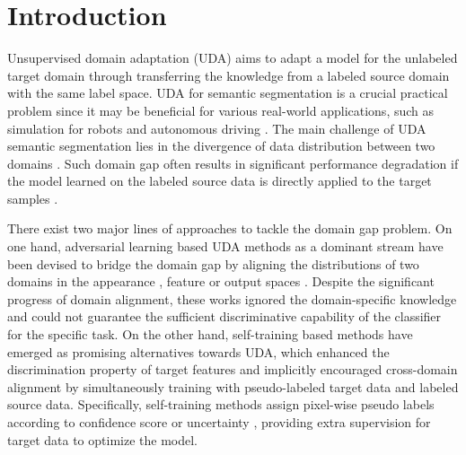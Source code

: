 \documentclass[final]{cvpr}
\begin{document}
\vspace{-0.5cm}
\section{Introduction}
\vspace{-0.2cm}
Unsupervised domain adaptation (UDA) aims to adapt a model for the unlabeled target domain through transferring the knowledge from a labeled source domain with the same label space. UDA for semantic segmentation is a crucial practical problem since it may be beneficial for various real-world applications, such as simulation for robots \cite{james2019sim} and autonomous driving \cite{wang2020differential}. The main challenge of UDA semantic segmentation lies in the divergence of data distribution between two domains \cite{chen2020adversarial, zheng2020rectifying}. Such domain gap often results in significant performance degradation if the model learned on the labeled source data is directly applied to the target samples \cite{zhang2019category, zou2018unsupervised}. 

There exist two major lines of approaches to tackle the domain gap problem. On one hand, adversarial learning based UDA methods as a dominant stream have been devised to bridge the domain gap by aligning the distributions of two domains in the appearance \cite{chen2019learning, chen2019crdoco, choi2019self, li2019bidirectional}, feature \cite{chen2019synergistic, du2019ssf, tran2019gotta, xu2020adversarial} or output spaces \cite{kim2020learning, luo2019taking, tsai2018learning, tsai2019domain}. Despite the significant progress of domain alignment, these works ignored the domain-specific knowledge and could not guarantee the sufficient discriminative capability of the classifier for the specific task. On the other hand, self-training based methods \cite{chen2019domain, chen2020adversarial, iqbal2020mlsl, lian2019constructing, liang2019exploring, mei2020instance, pan2020unsupervised, sakaridis2019guided, wang2020unsupervised, zhang2019category, zheng2020rectifying, zhu2020improving, zou2019confidence, zou2018unsupervised} have emerged as  promising alternatives towards UDA, which enhanced the discrimination property of target features and implicitly encouraged cross-domain alignment by simultaneously training with pseudo-labeled target data and labeled source data. Specifically, self-training methods assign pixel-wise pseudo labels according to confidence score \cite{iqbal2020mlsl, lian2019constructing, pan2020unsupervised, zou2018unsupervised} or uncertainty \cite{liang2019exploring, zheng2020rectifying}, providing extra supervision for target data to optimize the model. 
\end{document}
